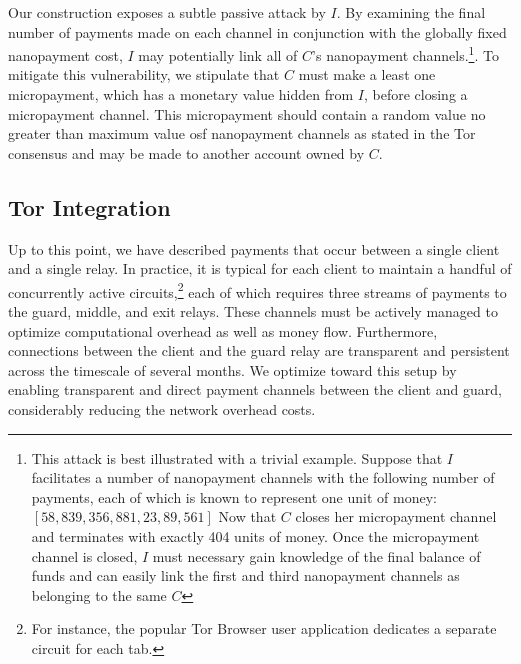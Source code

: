 Our construction exposes a subtle passive attack by $I$. By examining
the final number of payments made on each channel in conjunction with the
globally fixed nanopayment cost, $I$ may potentially link all of $C$'s
nanopayment channels.\footnote{This attack is best illustrated with a trivial
  example. Suppose that $I$ facilitates a number of nanopayment channels with
  the following number of payments, each of which is known to represent one unit
  of money: $[58, 839, 356, 881, 23, 89, 561]$ Now that $C$ closes her
  micropayment channel and terminates with exactly 404 units of money. Once the
  micropayment channel is closed, $I$ must necessary gain knowledge of the final
  balance of funds and can easily link the first and third nanopayment channels
  as belonging to the same $C$}. To mitigate this vulnerability, we stipulate
that $C$ must make a least one micropayment, which has a monetary value hidden
from $I$, before closing a micropayment channel. This micropayment should
contain a random value no greater than maximum value osf nanopayment channels as
stated in the Tor consensus and may be made to another account owned by $C$.


\subsection{Tor Integration}

Up to this point, we have described payments that occur between a single client
and a single relay. In practice, it is typical for each client to maintain a
handful of concurrently active circuits,\footnote{For instance, the popular Tor
  Browser user application dedicates a separate circuit for each tab.}  each of
which requires three streams of payments to the guard, middle, and exit
relays. These channels must be actively managed to optimize computational
overhead as well as money flow. Furthermore, connections between the client and
the guard relay are transparent and persistent across the timescale of several
months. We optimize toward this setup by enabling transparent and direct payment
channels between the client and guard, considerably reducing the network
overhead costs.
